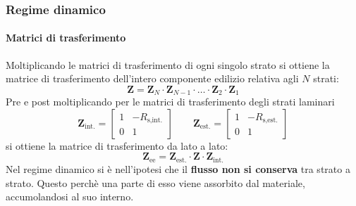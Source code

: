 \documentclass[aspectratio=141,10pt]{beamer}
\newcommand{\bc}[1]{\textcolor{pantone186}{\textbf{#1}}} %
\begin{document}
\begin{frame}
    \frametitle{Regime dinamico}
    \framesubtitle{Matrici di trasferimento}
    Moltiplicando le matrici di trasferimento di ogni singolo strato si ottiene la matrice di trasferimento dell'intero componente edilizio relativa agli $N$  strati:
\begin{equation*}
    \mathbf{Z}=\mathbf{Z}_{N}\cdot\mathbf{Z}_{N-1}\cdot\ldots\cdot\mathbf{Z}_{2}\cdot\mathbf{Z}_{1} 
\end{equation*}
\pause
Pre e post moltiplicando per le matrici di trasferimento degli strati laminari
\begin{equation*}
    \mathbf{Z}_{\text{int.}} = 
    \begin{bmatrix}
        1 & -R_{\text{s,int.}} \\
        0 & 1
    \end{bmatrix}
    \qquad
    \mathbf{Z}_{\text{est.}} = 
    \begin{bmatrix}
        1 & -R_{\text{s,est.}} \\
        0 & 1
    \end{bmatrix}
\end{equation*}
si ottiene la matrice di trasferimento da lato a lato:
\begin{equation*}
    \mathbf{Z}_{\text{ee}} = \mathbf{Z}_{\text{est.}} \cdot \mathbf{Z} \cdot \mathbf{Z}_{\text{int.}} 
\end{equation*}
\pause
Nel regime dinamico si è nell'ipotesi che il \bc{flusso non si conserva} tra strato a strato. Questo perchè una parte di esso viene assorbito dal materiale, accumolandosi al suo interno. 
\end{frame}
\end{document}
